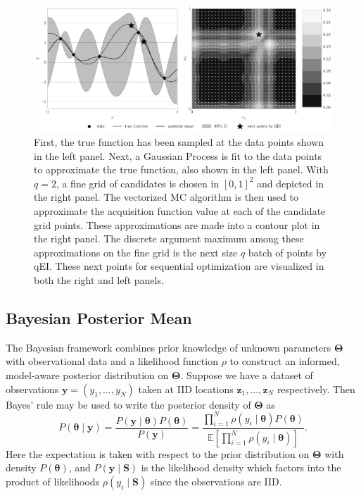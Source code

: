 \documentclass[graybox]{svmult}
\begin{document}
\begin{figure}[t]
    \centering
    \includegraphics[width=\textwidth]{figs/gp.pdf}
    \caption{First, the true function has been sampled at the data points shown in the left panel. Next, a Gaussian Process is fit to the data points to approximate the true function, also shown in the left panel. With $q=2$, a fine grid of candidates is chosen in $[0,1]^{2}$ and depicted in the right panel. The vectorized MC algorithm is then used to approximate the acquisition function value at each of the candidate grid points. These approximations are made into a contour plot in the right panel. The discrete argument maximum among these approximations on the fine grid is the next size $q$ batch of points by qEI. These next points for sequential optimization are visualized in both the right and left panels. }
    \label{fig:bo_qei}
\end{figure}

\subsection{Bayesian Posterior Mean}

The Bayesian framework combines prior knowledge of unknown parameters $\boldsymbol{\Theta}$ with observational data and a likelihood function $\rho$ to construct an informed, model-aware posterior distribution on $\boldsymbol{\Theta}$. Suppose we have a dataset of observations $\boldsymbol{y} = (y_1,\dots,y_{N})$ taken at IID locations $\boldsymbol{z}_1,\dots,\boldsymbol{z}_{N}$ respectively. Then Bayes' rule may be used to write the posterior density of $\boldsymbol{\Theta}$ as 
$$P\left(\boldsymbol{\theta} \mid \boldsymbol{y} \right) = \frac{P(\boldsymbol{y} \mid \boldsymbol{\theta}) P(\boldsymbol{\theta})}{P\left(\boldsymbol{y}\right)} = \frac{\prod_{i=1}^{N} \rho(y_i \mid \boldsymbol{\theta}) P(\boldsymbol{\theta})}{\mathbb{E}\left[\prod_{i=1}^{N} \rho(y_i \mid \boldsymbol{\theta})\right]}.$$
Here the expectation is taken with respect to the prior distribution on $\boldsymbol{\Theta}$ with density $P(\boldsymbol{\theta})$, and $P\left(\boldsymbol{y} \mid \boldsymbol{S} \right)$ is the likelihood density which factors into the product of likelihoods $\rho(y_i \mid \boldsymbol{S})$ since the observations are IID. 
\end{document}
